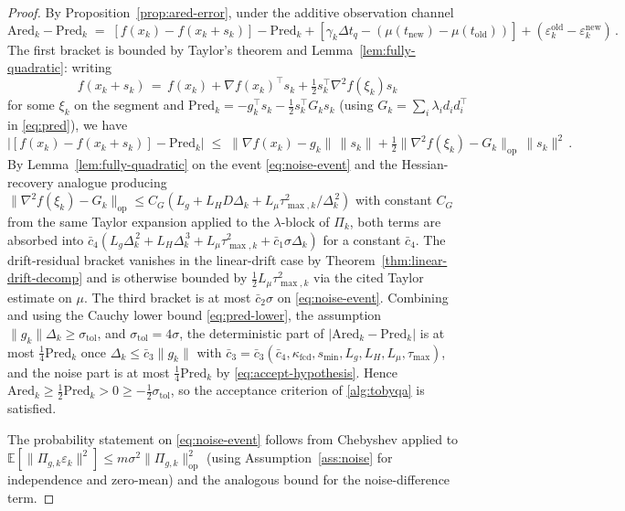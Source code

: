 \documentclass[11pt,a4paper]{article}
\begin{document}
\begin{proof}
By Proposition~\ref{prop:ared-error}, under the additive
observation channel
\[
  \mathrm{Ared}_k-\mathrm{Pred}_k
  \;=\;[f(x_k)-f(x_k+s_k)]-\mathrm{Pred}_k
     +[\gamma_k\Delta t_q-(\mu(t_{\mathrm{new}})-\mu(t_{\mathrm{old}}))]
     +(\varepsilon_k^{\mathrm{old}}-\varepsilon_k^{\mathrm{new}})\,.
\]
The first bracket is bounded by Taylor's theorem and
Lemma~\ref{lem:fully-quadratic}: writing
\[
  f(x_k+s_k)\,=\,f(x_k)+\nabla f(x_k)^{\!\top}s_k
              +\tfrac{1}{2}s_k^{\!\top}\nabla^2 f(\xi_k)s_k
\]
for some $\xi_k$ on the segment and
$\mathrm{Pred}_k=-g_k^{\!\top}s_k
                 -\tfrac{1}{2}s_k^{\!\top}G_ks_k$
(using $G_k=\sum_i\lambda_id_id_i^{\!\top}$ in
\eqref{eq:pred}), we have
\[
  |[f(x_k)-f(x_k+s_k)]-\mathrm{Pred}_k|
  \;\le\;\|\nabla f(x_k)-g_k\|\,\|s_k\|
       +\tfrac{1}{2}\|\nabla^2 f(\xi_k)-G_k\|_{\mathrm{op}}\,\|s_k\|^2\,.
\]
By Lemma~\ref{lem:fully-quadratic} on the event
\eqref{eq:noise-event} and the Hessian-recovery analogue
producing
$\|\nabla^2 f(\xi_k)-G_k\|_{\mathrm{op}}\le
 C_G(L_g+L_HD\Delta_k+L_\mu\tau_{\max,k}^2/\Delta_k^{\,2})$
with constant $C_G$ from the same Taylor expansion applied to
the $\lambda$-block of $\Pi_k$, both terms are absorbed into
$\bar c_4(L_g\Delta_k^{\,2}+L_H\Delta_k^{\,3}
         +L_\mu\tau_{\max,k}^{2}+\bar c_1\sigma\Delta_k)$
for a constant $\bar c_4$. The drift-residual bracket vanishes
in the linear-drift case by Theorem~\ref{thm:linear-drift-decomp}
and is otherwise bounded by
$\tfrac{1}{2}L_\mu\tau_{\max,k}^{2}$ via the cited Taylor
estimate on $\mu$. The third bracket is at most $\bar c_2\sigma$
on \eqref{eq:noise-event}. Combining and using the Cauchy
lower bound \eqref{eq:pred-lower}, the assumption
$\|g_k\|\Delta_k\ge\sigma_{\mathrm{tol}}$, and
$\sigma_{\mathrm{tol}}=4\sigma$, the deterministic part of
$|\mathrm{Ared}_k-\mathrm{Pred}_k|$ is at most $\tfrac{1}{4}\mathrm{Pred}_k$ once
$\Delta_k\le\bar c_3\|g_k\|$ with
$\bar c_3=\bar c_3(\bar c_4,\kappa_{\mathrm{fcd}},s_{\min},L_g,L_H,L_\mu,\tau_{\max})$,
and the noise part is at most $\tfrac{1}{4}\mathrm{Pred}_k$ by
\eqref{eq:accept-hypothesis}. Hence
$\mathrm{Ared}_k\ge\tfrac{1}{2}\mathrm{Pred}_k>0
\ge-\tfrac{1}{2}\sigma_{\mathrm{tol}}$, so the
acceptance criterion of \eqref{alg:tobyqa} is satisfied.

The probability statement on \eqref{eq:noise-event} follows
from Chebyshev applied to
$\mathbb{E}[\|\Pi_{g,k}\varepsilon_k\|^2]
 \le m\sigma^2\|\Pi_{g,k}\|_{\mathrm{op}}^{2}$ (using
Assumption~\ref{ass:noise} for independence and zero-mean) and
the analogous bound for the noise-difference term.
\end{proof}
\end{document}
